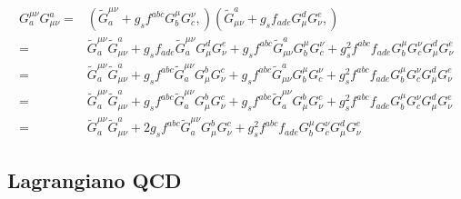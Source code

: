 \begin{frame}
\begin{align}
  {G}^{\mu\nu}_a {G}_{\mu\nu}^a=&
\left( \widetilde{G}^{\mu\nu}_a+g_s f^{abc}G^\mu_b G^\nu_c, \right)
\left( \widetilde{G}_{\mu\nu}^a+g_s f_{ade}G_\mu^d G_\nu^e, \right) \nonumber\\
=&\widetilde{G}^{\mu\nu}_a\widetilde{G}_{\mu\nu}^a+g_s f_{ade}\widetilde{G}^{\mu\nu}_aG_\mu^d G_\nu^e
+g_s f^{abc}\widetilde{G}_{\mu\nu}^a G^\mu_b G^\nu_c +g_s^2 f^{abc}f_{ade}G^\mu_b G^\nu_c G_\mu^d G_\nu^e 
\nonumber\\
=&\widetilde{G}^{\mu\nu}_a\widetilde{G}_{\mu\nu}^a+g_s f^{abc}\widetilde{G}^{\mu\nu}_aG_\mu^b G_\nu^c
+g_s f^{abc}\widetilde{G}_{\mu\nu}^a G^\mu_b G^\nu_c +g_s^2 f^{abc}f_{ade}G^\mu_b G^\nu_c G_\mu^d G_\nu^e 
\nonumber\\
=&\widetilde{G}^{\mu\nu}_a\widetilde{G}_{\mu\nu}^a+g_s f^{abc}\widetilde{G}^{\mu\nu}_aG_\mu^b G_\nu^c
+g_s f^{abc}\widetilde{G}^{\mu\nu}_aG_\mu^b G_\nu^c +g_s^2 f^{abc}f_{ade}G^\mu_b G^\nu_c G_\mu^d G_\nu^e 
\nonumber\\
=&\widetilde{G}^{\mu\nu}_a\widetilde{G}_{\mu\nu}^a+2g_s f^{abc}\widetilde{G}^{\mu\nu}_aG_\mu^b G_\nu^c
+g_s^2 f^{abc}f_{ade}G^\mu_b G^\nu_c G_\mu^d G_\nu^e 
\end{align}

\end{frame}
\subsection{Lagrangiano QCD}

